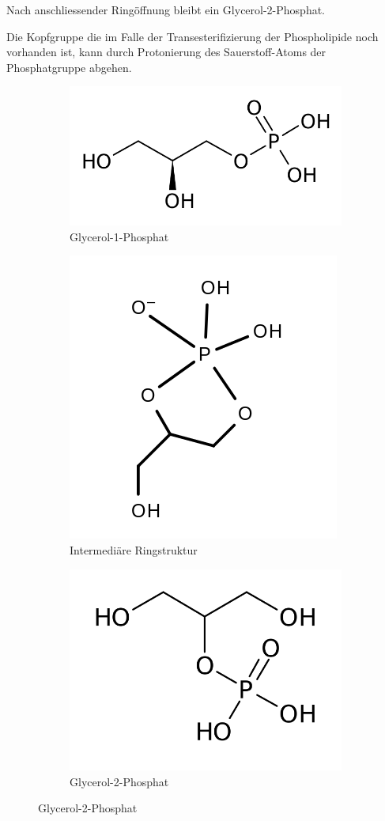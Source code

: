 \documentclass[a4paper,english]{scrreprt}
\begin{document}
Nach anschliessender Ringöffnung bleibt ein Glycerol-2-Phosphat.

Die Kopfgruppe die im Falle der Transesterifizierung der Phospholipide noch
vorhanden ist, kann durch Protonierung des Sauerstoff-Atoms der Phosphatgruppe
abgehen.

\begin{figure}
	\centering
	\begin{subfigure}{.9\textwidth}
		\includegraphics[width=0.5\linewidth]{img/glycerol_1_phosphat.png}
		\caption{Glycerol-1-Phosphat}
	\end{subfigure}

	\begin{subfigure}{.9\textwidth}
		\includegraphics[width=0.5\linewidth]{img/glycerol_phosphat_ring.png}
		\caption{Intermediäre Ringstruktur}
	\end{subfigure}

	\begin{subfigure}{.9\textwidth}
		\includegraphics[width=0.5\linewidth]{img/glycerol_2_phosphat.png}
		\caption{Glycerol-2-Phosphat}
	\end{subfigure}
\end{figure}





\end{document}
